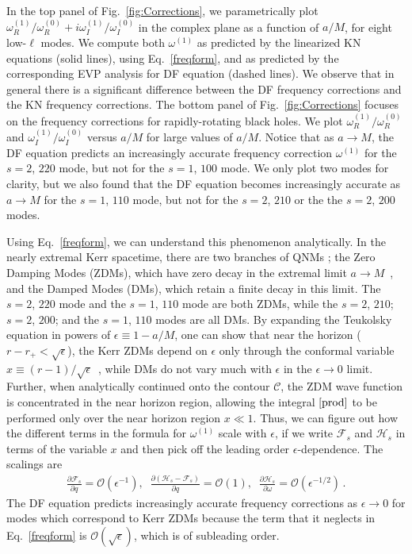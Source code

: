 \begin{refsection}
In the top panel of Fig.~\ref{fig:Corrections}, we parametrically plot $\omega^{(1)}_R/\omega^{(0)}_R+i\omega^{(1)}_I/\omega^{(0)}_I$ in the complex plane as a function of $a/M$, for eight low-$\ell$ modes. We compute both $\omega^{(1)}$ as predicted by the linearized KN equations (solid lines), using Eq.~\eqref{freqform}, and as predicted by the corresponding EVP analysis for DF equation (dashed lines).
We observe that in general there is a significant difference between the DF frequency corrections and the KN frequency corrections. The bottom panel of Fig.~\ref{fig:Corrections} focuses on the frequency corrections for rapidly-rotating black holes.
We plot $\omega^{(1)}_R/\omega^{(0)}_R$ and $\omega^{(1)}_I/\omega^{(0)}_I$ versus $a/M$ for large values of $a/M$. Notice that as $a \to M$, the DF equation predicts an increasingly accurate frequency correction $\omega^{(1)}$ for the $s=2$, $220$ mode, but not for the $s=1$, $100$ mode. 
We only plot two modes for clarity, but we also found that the DF equation becomes increasingly accurate as  $a \to M$ for the $s=1$, $110$ mode, but not for the $s=2$, $210$ or the the $s=2$, $200$ modes.

Using  Eq.~\eqref{freqform}, we can understand this phenomenon analytically. In the nearly extremal Kerr spacetime, there are two branches of QNMs \cite{Yang2012b, Yang:2013uba}; the Zero Damping Modes (ZDMs), which have zero decay in the extremal limit $a \to M$~\cite{Detweiler1980,Hod2008a}, and the Damped Modes (DMs), which retain a finite decay in this limit. The $s=2$, $220$ mode and the $s = 1$, $110$ mode are both ZDMs, while the $s=2$, $210$; $s=2$, $200$; and the $s=1$, $110$ modes are all DMs. By expanding the Teukolsky equation in powers of $\epsilon \equiv 1-a/M$, one can show that near the horizon ($r-r_+<\sqrt{\epsilon}$), the Kerr ZDMs depend on $\epsilon$ only through
the conformal variable $x \equiv (r-1)/\sqrt{\epsilon}$~\cite{TeukolskyPress1974,Yang:2013uba}, 
while DMs do not vary much with $\epsilon$ in the $\epsilon \rightarrow 0$ limit. Further, when analytically continued onto the contour $\mathscr{C}$, the ZDM wave function is concentrated in the near horizon region, allowing the integral $\eqref{prod}$ to be performed only over the near horizon region $x \ll 1$. 
Thus, we can figure out how the different terms in the formula for $\omega^{(1)}$ scale with $\epsilon$, if we write $\mathcal{F}_s$ and $\mathcal{H}_s$ in terms of the variable $x$ and then pick off the leading order $\epsilon$-dependence. The scalings are
\begin{align}
\frac{\partial \mathcal{F}_s}{\partial q}=\mathcal{O}(\epsilon^{-1}),\;\; \frac{\partial (\mathcal{H}_s-\mathcal{F}_s)}{\partial q} = \mathcal{O}(1) , \; \; 
 \frac{\partial \mathcal{H}_s}{\partial \omega} = \mathcal{O}(\epsilon^{-1/2}) \,.\label{scalings}
\end{align}
The DF equation predicts increasingly accurate frequency corrections as $\epsilon \to 0$ for modes which correspond to Kerr ZDMs because the term that it neglects in Eq.~\eqref{freqform} is $\mathcal{O}(\sqrt\epsilon)$, which is of subleading order.


\end{refsection}
